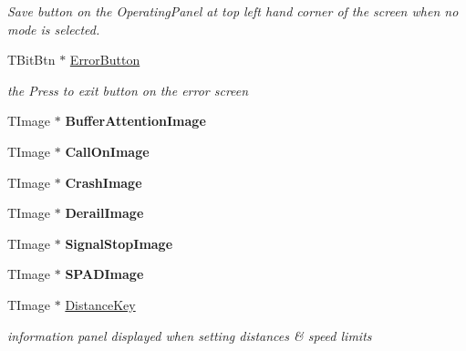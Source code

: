 \begin{DoxyCompactItemize}
\begin{DoxyCompactList}\small\item\em Save button on the Operating\+Panel at top left hand corner of the screen when no mode is selected. \end{DoxyCompactList}\item 
\mbox{\label{class_t_interface_a4fab2d2cef5cefbdc6e2cbdbc18e3c20}} 
T\+Bit\+Btn $\ast$ \mbox{\hyperlink{class_t_interface_a4fab2d2cef5cefbdc6e2cbdbc18e3c20}{Error\+Button}}
\begin{DoxyCompactList}\small\item\em the \textquotesingle{}Press to exit\textquotesingle{} button on the error screen \end{DoxyCompactList}\item 
\mbox{\label{class_t_interface_a489447de6f443efcfcba7506b420e59f}} 
T\+Image $\ast$ {\bfseries Buffer\+Attention\+Image}
\item 
\mbox{\label{class_t_interface_abf60e54b8e6b6faef216dde3c2a68b5d}} 
T\+Image $\ast$ {\bfseries Call\+On\+Image}
\item 
\mbox{\label{class_t_interface_abcd9d2a23c9167b3bba5e4b2f2b5d002}} 
T\+Image $\ast$ {\bfseries Crash\+Image}
\item 
\mbox{\label{class_t_interface_a1290b2c6729c464fb54ee97fe8a57b43}} 
T\+Image $\ast$ {\bfseries Derail\+Image}
\item 
\mbox{\label{class_t_interface_a75d82cea25dd30c67ee964e99be3b639}} 
T\+Image $\ast$ {\bfseries Signal\+Stop\+Image}
\item 
\mbox{\label{class_t_interface_a187eafb0bd574ab4b106ea526e05f139}} 
T\+Image $\ast$ {\bfseries S\+P\+A\+D\+Image}
\item 
\mbox{\label{class_t_interface_aefe8c85a36e64f78a69e5cde5ba13727}} 
T\+Image $\ast$ \mbox{\hyperlink{class_t_interface_aefe8c85a36e64f78a69e5cde5ba13727}{Distance\+Key}}
\begin{DoxyCompactList}\small\item\em information panel displayed when setting distances \& speed limits \end{DoxyCompactList}\item 

\end{DoxyCompactItemize}
